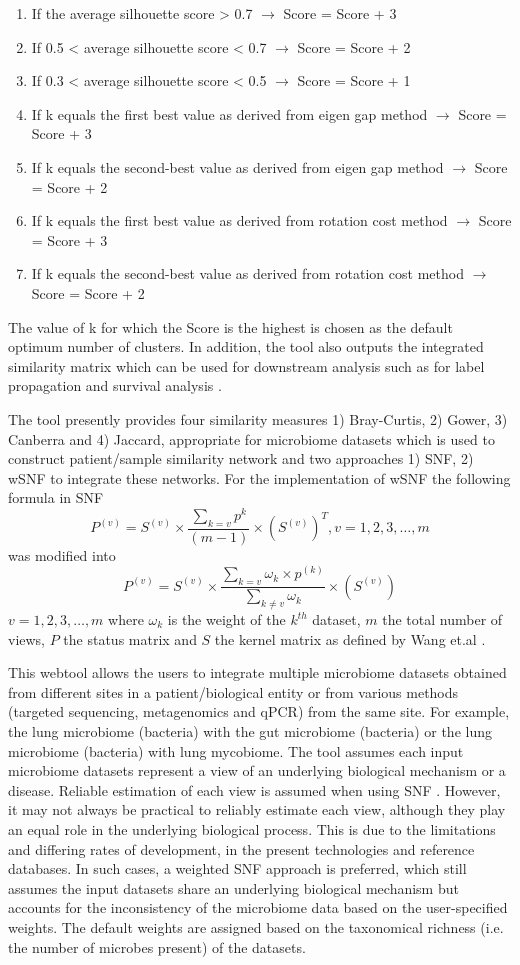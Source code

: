 \begin{enumerate}
	\item If the average silhouette score > 0.7 $\rightarrow$ Score = Score + 3
	\item If 0.5 < average silhouette score < 0.7 $\rightarrow$ Score = Score + 2
	\item If 0.3 < average silhouette score < 0.5 $\rightarrow$ Score = Score + 1
	\item If k equals the first best value as derived from eigen gap method $\rightarrow$ Score = Score + 3
	\item If k equals the second-best value as derived from eigen gap method $\rightarrow$ Score = Score + 2
	\item If k equals the first best value as derived from rotation cost method $\rightarrow$ Score = Score + 3
	\item If k equals the second-best value as derived from rotation cost method $\rightarrow$ Score = Score + 2 
\end{enumerate} 
The value of k for which the Score is the highest is chosen as the default optimum number of clusters. In addition, the tool also outputs the integrated similarity matrix which can be used for downstream analysis such as for label propagation and survival analysis \cite{Wang2014}.

The tool presently provides four similarity measures 1) Bray-Curtis, 2) Gower, 3) Canberra and 4) Jaccard, appropriate for microbiome datasets which is used to construct patient/sample similarity network and two approaches 1) SNF, 2) wSNF to integrate these networks. For the implementation of wSNF the following formula in SNF
$$P^{(v)}=S^{(v)} \times \frac{\sum_{k=v} p^{k}}{(m-1)} \times (S^{(v)})^{T}, v=1,2,3, \ldots, m$$ was modified into $$P^{(v)}=S^{(v)} \times \frac{\sum_{k=v} \omega_{k} \times p^{(k)}}{\sum_{k \neq v} \omega_{k}} \times(S^{(v)})$$ $v=1,2,3, \ldots, m$
where $\omega_{k}$ is the weight of the $k^{ th}$ dataset, $m$ the total number of views, $P$ the status matrix and $S$ the kernel matrix as defined by Wang et.al \cite{Wang2014}.

This webtool allows the users to integrate multiple microbiome datasets obtained from different sites in a patient/biological entity or from various methods (targeted sequencing, metagenomics and qPCR) from the same site. For example, the lung microbiome (bacteria) with the gut microbiome (bacteria) or the lung microbiome (bacteria) with lung mycobiome. The tool assumes each input microbiome datasets represent a view of an underlying biological mechanism or a disease. Reliable estimation of each view is assumed when using SNF \cite{Jiang2019}. However, it may not always be practical to reliably estimate each view, although they play an equal role in the underlying biological process. This is due to the limitations and differing rates of development, in the present technologies and reference databases. In such cases, a weighted SNF approach is preferred, which still assumes the input datasets share an underlying biological mechanism but accounts for the inconsistency of the microbiome data based on the user-specified weights. The default weights are assigned based on the taxonomical richness (i.e. the number of microbes present) of the datasets. 

